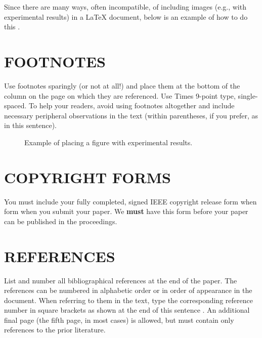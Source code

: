 \documentclass{article}
\begin{document}
Since there are many ways, often incompatible, of including images (e.g., with
experimental results) in a LaTeX document, below is an example of how to do
this \cite{Lamp86}.

\section{FOOTNOTES}
\label{sec:foot}

Use footnotes sparingly (or not at all!) and place them at the bottom of the
column on the page on which they are referenced. Use Times 9-point type,
single-spaced. To help your readers, avoid using footnotes altogether and
include necessary peripheral observations in the text (within parentheses, if
you prefer, as in this sentence).

\begin{figure}[htb]


%
\caption{Example of placing a figure with experimental results.}
\label{fig:res}
%
\end{figure}



\section{COPYRIGHT FORMS}
\label{sec:copyright}

You must include your fully completed, signed IEEE copyright release form when
form when you submit your paper. We {\bf must} have this form before your paper
can be published in the proceedings.

\section{REFERENCES}
\label{sec:ref}

List and number all bibliographical references at the end of the
paper. The references can be numbered in alphabetic order or in
order of appearance in the document. When referring to them in
the text, type the corresponding reference number in square
brackets as shown at the end of this sentence \cite{C2}. An
additional final page (the fifth page, in most cases) is
allowed, but must contain only references to the prior
literature.

\printbibliography[heading=none]
\end{document}
